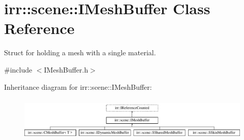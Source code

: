 \hypertarget{classirr_1_1scene_1_1IMeshBuffer}{}\section{irr\+:\+:scene\+:\+:I\+Mesh\+Buffer Class Reference}
\label{classirr_1_1scene_1_1IMeshBuffer}


Struct for holding a mesh with a single material.  




{\ttfamily \#include $<$I\+Mesh\+Buffer.\+h$>$}

Inheritance diagram for irr\+:\+:scene\+:\+:I\+Mesh\+Buffer\+:\begin{figure}[H]
\begin{center}
\leavevmode
\includegraphics[height=2.131979cm]{classirr_1_1scene_1_1IMeshBuffer}
\end{center}
\end{figure}
